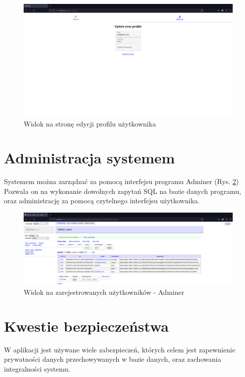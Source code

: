 \documentclass[a4paper,twoside,12pt]{book}
\begin{document}
\begin{figure}[H]
\centering
\includegraphics[width=1.0\textwidth]{./images/strona-edycji-profilu.png}
\caption{Widok na stronę edycji profilu użytkownika}
\label{fig:strona-edycja-profilu}
\end{figure}

\section{Administracja systemem}

Systemem można zarządzać za pomocą interfejsu programu Adminer (Rys. \ref{fig:adminer})
Pozwala on na wykonanie dowolnych zapytań SQL na bazie danych programu,
oraz administrację za pomocą czytelnego interfejsu użytkownika.

\begin{figure}[H]
\centering
\includegraphics[width=1.0\textwidth]{./images/adminer.png}
\caption{Widok na zarejestrowanych użytkowników - Adminer}
\label{fig:adminer}
\end{figure}

\section{Kwestie bezpieczeństwa}

W aplikacji jest używane wiele zabezpieczeń, których celem jest zapewnienie prywatności
danych przechowywanych w bazie danych, oraz zachowania integralności systemu.
\end{document}
